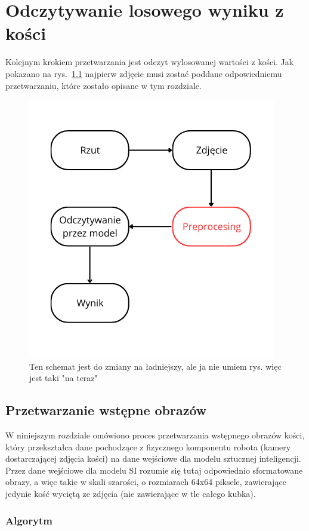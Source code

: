 \chapter{Odczytywanie losowego wyniku z kości}\label{ch:odczytywanie-losowego-wyniku-z-kosci}

Kolejnym krokiem przetwarzania jest odczyt wylosowanej wartości z kości.
Jak pokazano na rys.~\ref{fig:schemat_workflow}
najpierw zdjęcie musi zostać poddane odpowiedniemu przetwarzaniu, które zostało opisane w tym rozdziale.

\begin{figure}[H]
    \centering
    \includegraphics[width=0.5\linewidth]{chapters/04-czytanie/figures/schemat}
    \caption{Ten schemat jest do zmiany na ładniejszy, ale ja nie umiem rys. więc jest taki "na teraz"}
    \label{fig:schemat_workflow}
\end{figure}

\section{Przetwarzanie wstępne obrazów}\label{sec:preprocessing}

W niniejszym rozdziale omówiono proces przetwarzania wstępnego obrazów kości,
który przekształca dane pochodzące z fizycznego komponentu robota (kamery dostarczającej zdjęcia kości) na dane wejściowe dla modelu sztucznej inteligencji.
Przez dane wejściowe dla modelu SI rozumie się tutaj odpowiednio sformatowane obrazy, a więc takie w skali szarości,
o rozmiarach 64x64 piksele, zawierające jedynie kość wyciętą ze zdjęcia (nie zawierające w tle całego kubka).

\subsection{Algorytm}\label{subsec:algorytm}

